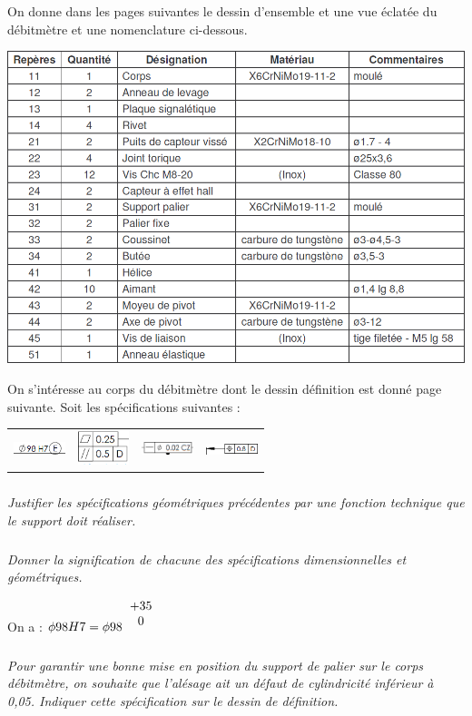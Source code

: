 \documentclass[10pt,fleqn]{article} %
\begin{document}
\begin{multicols}{2}
On donne dans les pages suivantes le dessin d'ensemble et une vue éclatée du débitmètre et une nomenclature ci-dessous.
\begin{center}
\includegraphics[width=\linewidth]{images/debitmetre_04}
\end{center}


On s'intéresse au corps du débitmètre dont le dessin définition est donné page suivante. 
Soit les spécifications suivantes : 
\begin{center}
\begin{tabular}{cccc}
\includegraphics[width=1.5cm]{images/debitmetre_05_a} &
\includegraphics[width=1.5cm]{images/debitmetre_05_b} &
\includegraphics[width=1.5cm]{images/debitmetre_05_c} &
\includegraphics[width=1.5cm]{images/debitmetre_05_d} \\
\end{tabular}
\end{center}

\subparagraph{}\textit{Justifier les spécifications géométriques précédentes par une fonction technique que le support doit réaliser. }

\subparagraph{}\textit{Donner la signification de chacune des spécifications dimensionnelles et géométriques.}
\begin{rem}
On a : $\phi 98 H7 = \phi 98 ^{\begin{tabular}{c}+35 \\ 0\end{tabular}}$
\end{rem}

\subparagraph{}\textit{Pour garantir une bonne mise en position du support de palier sur le corps débitmètre, on souhaite que l'alésage ait un défaut de cylindricité inférieur à 0,05. Indiquer cette spécification sur le dessin de définition.}
\end{multicols}
\end{document}
